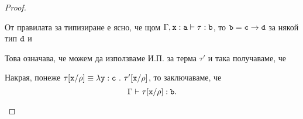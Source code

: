 \begin{proof}
\begin{itemize}
    От правилата за типизиране е ясно, че щом $\Gamma, \type{x}{a} \vdash \tau : \vv{b}$, то
    $\vv{b} = \vv{c} \to \vv{d}$ за някой тип $\vv{d}$ и
    \begin{prooftree}
    \end{prooftree}
    Това означава, че можем да използваме И.П. за терма $\tau'$ и така получаваме, че
    \begin{prooftree}
    \end{prooftree}
    Накрая, понеже $\tau\subst{x}{\rho} \equiv \lamb{y}{c}{\tau'\subst{x}{\rho}}$, то
    заключаваме, че
    \[\Gamma \vdash \tau\subst{x}{\rho}:\vv{b}.\]
  \end{itemize}
\end{proof}



